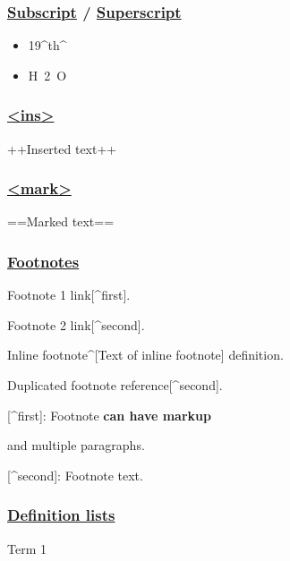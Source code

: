 \documentclass{article}
\begin{document}
\subsubsection{\href{https://github.com/markdown-it/markdown-it-sub}{Subscript} / \href{https://github.com/markdown-it/markdown-it-sup}{Superscript}}

\begin{itemize}
\item 19^th^
\item H~2~O




\end{itemize}
\subsubsection{\href{https://github.com/markdown-it/markdown-it-ins}{<ins>}}

++Inserted text++



\subsubsection{\href{https://github.com/markdown-it/markdown-it-mark}{<mark>}}

==Marked text==



\subsubsection{\href{https://github.com/markdown-it/markdown-it-footnote}{Footnotes}}

Footnote 1 link[^first].

Footnote 2 link[^second].

Inline footnote^[Text of inline footnote] definition.

Duplicated footnote reference[^second].

[^first]: Footnote \textbf{can have markup}

and multiple paragraphs.


[^second]: Footnote text.



\subsubsection{\href{https://github.com/markdown-it/markdown-it-deflist}{Definition lists}}

Term 1
\end{document}
